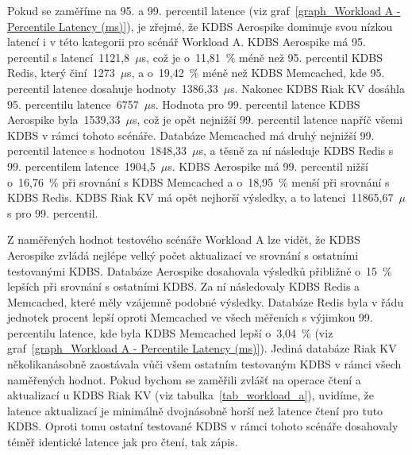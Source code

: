 \documentclass[czech,master,dept460,male,csharp,cpdeclaration]{diploma}
\begin{document}
	Pokud se zaměříme na 95. a 99. percentil latence (viz graf~\ref{graph_Workload A - Percentile Latency (ms)}), je zřejmé, že KDBS Aerospike dominuje svou nízkou latencí i v této kategorii pro scénář Workload A. KDBS Aerospike má 95. percentil s latencí~1121,8~$\mu$s, což je o~11,81~\% méně než 95. percentil KDBS Redis, který činí~1273~$\mu$s, a o~19,42~\% méně než KDBS Memcached, kde 95. percentil latence dosahuje hodnoty~1386,33~$\mu$s. Nakonec KDBS Riak KV dosáhla 95. percentilu latence~6757~$\mu$s. Hodnota pro 99. percentil latence KDBS Aerospike byla~1539,33~$\mu$s, což je opět nejnižší 99. percentil latence napříč všemi KDBS v rámci tohoto scénáře. Databáze Memcached má druhý nejnižší 99. percentil latence s hodnotou~1848,33~$\mu$s, a těsně za ní následuje KDBS Redis s 99. percentilem latence~1904,5~$\mu$s. KDBS Aerospike má 99. percentil nižší o~16,76~\% při srovnání s KDBS Memcached a o~18,95~\% menší při srovnání s KDBS Redis. KDBS Riak KV má opět nejhorší výsledky, a to latenci~11865,67~$\mu$s pro 99. percentil.
	
	Z naměřených hodnot testového scénáře Workload A lze vidět, že KDBS Aerospike zvládá nejlépe velký počet aktualizací ve srovnání s ostatními testovanými KDBS. Databáze Aerospike dosahovala výsledků přibližně o~15~\% lepších při srovnání s ostatními KDBS. Za ní následovaly KDBS Redis a Memcached, které měly vzájemně podobné výsledky. Databáze Redis byla v řádu jednotek procent lepší oproti Memcached ve všech měřeních s výjimkou 99. percentilu latence, kde byla KDBS Memcached lepší o~3,04~\% (viz graf~\ref{graph_Workload A - Percentile Latency (ms)}). Jediná databáze Riak KV několikanásobně zaostávala vůči všem ostatním testovaným KDBS v rámci všech naměřených hodnot. Pokud bychom se zaměřili zvlášť na operace čtení a aktualizací u KDBS Riak KV (viz tabulka~\ref{tab_workload_a}), uvidíme, že latence aktualizací je minimálně dvojnásobně horší než latence čtení pro tuto KDBS. Oproti tomu ostatní testované KDBS v rámci tohoto scénáře dosahovaly téměř identické latence jak pro čtení, tak zápis.
	
\end{document}
